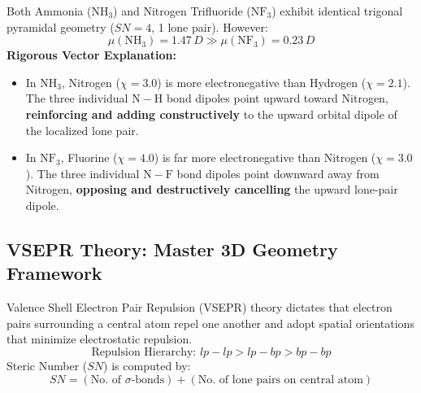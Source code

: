 \documentclass[10pt,twoside,openright]{book}
\begin{document}
\begin{trapbox}
Both Ammonia ($\mathrm{NH_3}$) and Nitrogen Trifluoride ($\mathrm{NF_3}$) exhibit identical trigonal pyramidal geometry ($SN = 4$, 1 lone pair). However:
\begin{equation}
  \mu(\mathrm{NH_3}) = 1.47\,\si{D} \gg \mu(\mathrm{NF_3}) = 0.23\,\si{D}
\end{equation}
\textbf{Rigorous Vector Explanation:}
\begin{itemize}
  \item In $\mathrm{NH_3}$, Nitrogen ($\chi = 3.0$) is more electronegative than Hydrogen ($\chi = 2.1$). The three individual $\mathrm{N-H}$ bond dipoles point upward toward Nitrogen, \textbf{reinforcing and adding constructively} to the upward orbital dipole of the localized lone pair.
  \item In $\mathrm{NF_3}$, Fluorine ($\chi = 4.0$) is far more electronegative than Nitrogen ($\chi = 3.0$). The three individual $\mathrm{N-F}$ bond dipoles point downward away from Nitrogen, \textbf{opposing and destructively cancelling} the upward lone-pair dipole.
\end{itemize}
\end{trapbox}

\subsection{VSEPR Theory: Master 3D Geometry Framework}
Valence Shell Electron Pair Repulsion (VSEPR) theory dictates that electron pairs surrounding a central atom repel one another and adopt spatial orientations that minimize electrostatic repulsion.
\begin{equation}
  \text{Repulsion Hierarchy: } lp-lp > lp-bp > bp-bp
\end{equation}
Steric Number ($SN$) is computed by:
\begin{equation}
  SN = (\text{No. of }\sigma\text{-bonds}) + (\text{No. of lone pairs on central atom})
\end{equation}
\end{document}
